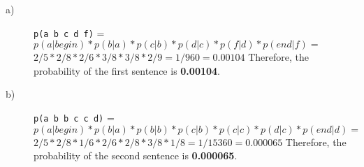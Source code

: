 \begin{description}
    \item[a)] \verb/p(a b c d f)/ = \n
        $p(a|begin)*p(b|a)*p(c|b)*p(d|c)*p(f|d)*p(end|f) =$ \n
        $2/5*2/8*2/6*3/8*3/8*2/9 = 1/960 = 0.00104$\n\n
        Therefore, the probability of the first sentence is \textbf{0.00104}.
    \item[b)] \verb/p(a b b c c d)/ = \n
        $p(a|begin)*p(b|a)*p(b|b)*p(c|b)*p(c|c)*p(d|c)*p(end|d) =$ \n
        $2/5*2/8*1/6*2/6*2/8*3/8*1/8 = 1/15360 = 0.000065$\n\n
        Therefore, the probability of the second sentence is \textbf{0.000065}.
\end{description}